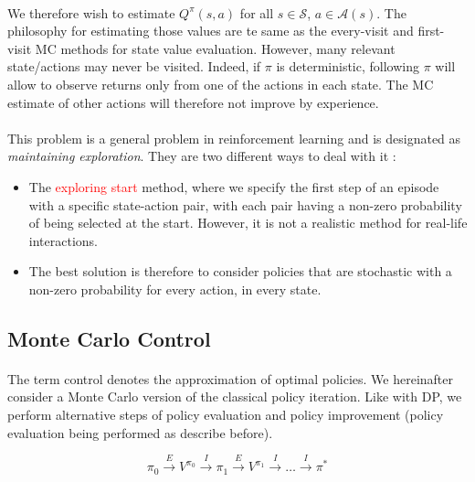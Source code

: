 \documentclass[a4paper]{article}
\begin{document}
{{{{					\paragraph{} We therefore wish to estimate $Q^\pi(s,a)$ for all $s\in\mathcal{S}$, $a\in\mathcal{A}(s)$. The philosophy for estimating those values are te same as the every-visit and first-visit MC methods for state value evaluation. \newline
					However, many relevant state/actions may never be visited. Indeed, if $\pi$ is deterministic, following $\pi$ will allow to observe returns only from one of the actions in each state. The MC estimate of other actions will therefore not improve by experience. 
					
					\paragraph{} This problem is a general problem in reinforcement learning and is designated as \emph{maintaining exploration}. They are two different ways to deal with it : 
					\begin{itemize}
						\item The \textcolor{red}{exploring start} method, where we specify the first step of an episode with a specific state-action pair, with each pair having a non-zero probability of being selected at the start. However, it is not a realistic method for real-life interactions. 
						\item The best solution is therefore to consider policies that are stochastic with a non-zero probability for every action, in every state. 
					\end{itemize}
				}
			}
			
			\subsection{Monte Carlo Control}
			{
				\paragraph{} The term control denotes the approximation of optimal policies. We hereinafter consider a Monte Carlo version of the classical policy iteration. Like with DP, we perform alternative steps of policy evaluation and policy improvement (policy evaluation being performed as describe before). 
				
				\begin{equation}
				\pi_0 \overset{E}{\longrightarrow} V^{\pi_0} \overset{I}{\longrightarrow} \pi_1 \overset{E}{\longrightarrow} V^{\pi_1} \overset{I}{\longrightarrow} \hdots \overset{I}{\longrightarrow} \pi^*
			\end{equation}
			
}}}
\end{document}
